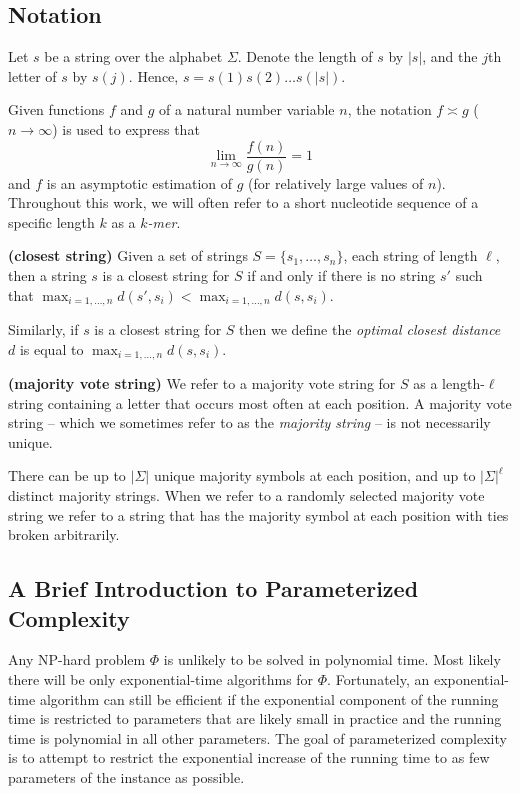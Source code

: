 \subsection{Notation}

Let $s$ be a string over the alphabet $\Sigma$.  Denote the length of $s$ by $|s|$, and the $j$th letter of $s$ by $s(j)$.  Hence, $s = s(1)s(2)\ldots s(|s|)$.  

Given functions $f$ and $g$ of a natural number variable $n$, the notation $f \asymp g $ ($n \rightarrow \infty$) is used to express that $$\lim_{n \rightarrow \infty} \frac{f(n)}{g(n)} = 1$$ and $f$ is an asymptotic estimation of $g$ (for relatively large values of $n$).  Throughout this work, we will often refer to a short nucleotide sequence of a specific length $k$ as a {\em $k$-mer}.

\begin{definition} {\bf (closest string)}  Given a set of strings $S = \{s_1, \ldots, s_n\}$, each string of length  $\ell$, then a string $s$ is a closest string for $S$ if and only if there is no string $s'$ such that $\max_{i = 1, \ldots, n} d(s', s_i) < \max_{i = 1, \ldots, n} d(s, s_i)$. \end{definition} 

\noindent Similarly, if $s$ is a closest string for $S$ then we define the {\em optimal closest distance} $d$ is equal to $\max_{i = 1, \ldots, n} d(s, s_i)$.  

\begin{definition} {\bf (majority vote string)} We refer to a majority vote string for $S$ as a length-$\ell$ string containing a letter that occurs most often at each position.  A majority vote string -- which we sometimes refer to as the {\em majority string} -- is not necessarily unique. \end{definition}

\noindent There can be up to $|\Sigma|$ unique majority symbols at each position, and up to $|\Sigma|^{\ell}$ distinct majority strings.  When we refer to a randomly selected majority vote string we refer to a string that has the majority symbol at each position with ties broken arbitrarily. 

\subsection{A Brief Introduction to Parameterized Complexity}

Any NP-hard problem $\Phi$ is unlikely to be solved in polynomial time.  Most likely there will be only exponential-time algorithms for $\Phi$.  Fortunately, an exponential-time algorithm can still be efficient if the exponential component of the running time is restricted to parameters that are likely small in practice and the running time is polynomial in all other parameters.  The goal of parameterized complexity is to attempt to restrict the exponential increase of the running time to as few parameters of the instance as possible. 

